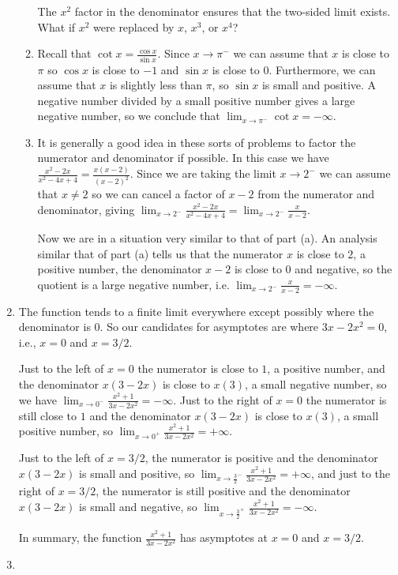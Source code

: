 \documentclass{article}
\newcommand{\ds}{\displaystyle}
\begin{document}
\begin{enumerate}
\begin{enumerate}
    The $x^2$ factor in the denominator ensures that the two-sided limit
    exists.  What if $x^2$ were replaced by $x$, $x^3$, or $x^4$?
  \item %
    Recall that $\ds \cot x = \frac{\cos x}{\sin x}$. Since $x\to \pi^-$
    we can assume that $x$ is close to $\pi$ so $\cos x$ is close to $-1$
    and $\sin x$ is close to $0$.  Furthermore, we can assume that $x$ is
    slightly less than $\pi$, so $\sin x$ is small and positive.  A negative
    number divided by a small positive number gives a large negative number,
    so we conclude that $\ds \lim_{x\to \pi^-} \cot x = -\infty$.
  \item %
    It is generally a good idea in these sorts of problems to factor
    the numerator and denominator if possible.  In this case we have
    $\ds \frac{x^2-2x}{x^2-4x+4} = \frac{x(x-2)}{(x-2)^2}$.  Since we
    are taking the limit $x\to 2^-$ we can assume that $x\ne 2$ so we can
    cancel a factor of $x-2$ from the numerator and denominator, giving
    $\ds \lim_{x\to 2^-} \frac{x^2-2x}{x^2-4x+4} = \lim_{x\to 2^-}
    \frac{x}{x-2}$.

    Now we are in a situation very similar to that of part (a).  An analysis
    similar that of part (a) tells us that the numerator 
    $x$ is close to $2$, a positive number, the denominator $x-2$ is close
    to $0$ and negative, so the quotient is a large negative number, i.e.
    $\lim_{x\to 2^-} \frac{x}{x-2} = -\infty$.
  \end{enumerate}
\item %
  The function tends to a finite limit
  everywhere except possibly where the denominator is $0$.  So our 
  candidates for asymptotes are where $3x-2x^2=0$, i.e., $x=0$ and $x=3/2$.

  Just to the left of $x=0$ the numerator 
  is close to $1$, a positive number, and the
  denominator $x(3-2x)$ is close to $x(3)$, a small negative number,
  so we have $\ds \lim_{x\to 0^-} \frac{x^2+1}{3x-2x^2} = -\infty$.
  Just to the right of $x=0$ the numerator is still close to $1$ and the
  denominator $x(3-2x)$ is close to $x(3)$, a small positive number,
  so $\ds\lim_{x\to 0^+} \frac{x^2+1}{3x-2x^2} = +\infty$.

  Just to the left of $x=3/2$, the numerator is positive and the denominator
  $x(3-2x)$ is small and positive, 
  so $\ds\lim_{x\to \frac{3}{2}^-} \frac{x^2+1}{3x-2x^2}
  = +\infty$, and just to the right of $x=3/2$, the numerator is still 
  positive and the denominator $x(3-2x)$ is small and negative, so
  $\ds\lim_{x\to \frac{3}{2}^+} \frac{x^2+1}{3x-2x^2} = -\infty$.

  In summary, the function $\ds \frac{x^2+1}{3x-2x^2}$ has asymptotes at
  $x=0$ and $x=3/2$.
\item %
\end{enumerate}
\end{document}

